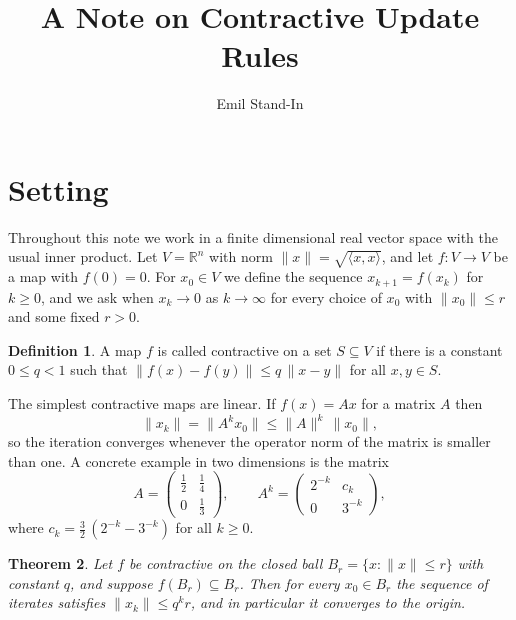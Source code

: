 \documentclass[10pt]{article}
\title{A Note on Contractive Update Rules}
\author{Emil Stand-In}
\date{}
\newtheorem{theorem}{Theorem}
\theoremstyle{definition}
\newtheorem{definition}[theorem]{Definition}
\begin{document}
\maketitle

\section{Setting}

Throughout this note we work in a finite dimensional real vector space with
the usual inner product. Let $V=\mathbb{R}^n$ with norm $\|x\|=\sqrt{\langle
x,x\rangle}$, and let $f\colon V\to V$ be a map with $f(0)=0$. For
$x_0\in V$ we define the sequence $x_{k+1}=f(x_k)$ for $k\ge 0$, and we ask
when $x_k\to 0$ as $k\to\infty$ for every choice of $x_0$ with
$\|x_0\|\le r$ and some fixed $r>0$.

\begin{definition}
A map $f$ is called contractive on a set $S\subseteq V$ if there is a
constant $0\le q<1$ such that $\|f(x)-f(y)\|\le q\,\|x-y\|$ for all
$x,y\in S$.
\end{definition}

The simplest contractive maps are linear. If $f(x)=Ax$ for a matrix $A$
then
\begin{equation}
  \|x_k\| = \|A^k x_0\| \le \|A\|^k\,\|x_0\| ,
  \label{eq:linear}
\end{equation}
so the iteration converges whenever the operator norm of the matrix is
smaller than one. A concrete example in two dimensions is the matrix
\begin{equation}
  A = \begin{pmatrix} \tfrac12 & \tfrac14 \\[2pt] 0 & \tfrac13 \end{pmatrix},
  \qquad
  A^k = \begin{pmatrix} 2^{-k} & c_k \\ 0 & 3^{-k} \end{pmatrix},
  \label{eq:matrix}
\end{equation}
where $c_k = \tfrac32\,(2^{-k}-3^{-k})$ for all $k\ge 0$.

\begin{theorem}\label{thm:main}
Let $f$ be contractive on the closed ball $B_r=\{x:\|x\|\le r\}$ with
constant $q$, and suppose $f(B_r)\subseteq B_r$. Then for every $x_0\in B_r$
the sequence of iterates satisfies $\|x_k\|\le q^k r$, and in particular it
converges to the origin.
\end{theorem}
\end{document}
